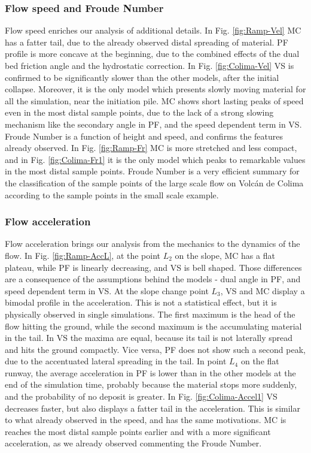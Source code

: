 \documentclass{article}
\begin{document}
\subsubsection{Flow speed and Froude Number}
Flow speed enriches our analysis of additional details. In Fig. \ref{fig:Ramp-Vel} MC has a fatter tail, due to the already observed distal spreading of material. PF profile is more concave at the beginning, due to the combined effects of the dual bed friction angle and the hydrostatic correction. In Fig. \ref{fig:Colima-Vel} VS is confirmed to be significantly slower than the other models, after the initial collapse. Moreover, it is the only model which presents slowly moving material for all the simulation, near the initiation pile. MC shows short lasting peaks of speed even in the most distal sample points, due to the lack of a strong slowing mechanism like the secondary angle in PF, and the speed dependent term in VS. Froude Number is a function of height and speed, and confirms the features already observed. In Fig. \ref{fig:Ramp-Fr} MC is more stretched and less compact, and in Fig. \ref{fig:Colima-Fr1} it is the only model which peaks to remarkable values in the most distal sample points. Froude Number is a very efficient summary for the classification of the sample points of the large scale flow on Volc\'{a}n de Colima according to the sample points in the small scale example.

\subsubsection{Flow acceleration}
Flow acceleration brings our analysis from the mechanics to the dynamics of the flow. In Fig. \ref{fig:Ramp-AccL}, at the point $L_2$ on the slope, MC has a flat plateau, while PF is linearly decreasing, and VS is bell shaped. Those differences are a consequence of the assumptions behind the models - dual angle in PF, and speed dependent term in VS. At the slope change point $L_3$, VS and MC display a bimodal profile in the acceleration. This is not a statistical effect, but it is physically observed in single simulations. The first maximum is the head of the flow hitting the ground, while the second maximum is the accumulating material in the tail. In VS the maxima are equal, because its tail is not laterally spread and hits the ground compactly. Vice versa, PF does not show such a second peak, due to the accentuated lateral spreading in the tail. In point $L_4$ on the flat runway, the average acceleration in PF is lower than in the other models at the end of the simulation time, probably because the material stops more suddenly, and the probability of no deposit is greater. In Fig. \ref{fig:Colima-Accel1} VS decreases faster, but also displays a fatter tail in the acceleration. This is similar to what already observed in the speed, and has the same motivations. MC is reaches the most distal sample points earlier and with a more significant acceleration, as we already observed commenting the Froude Number.
\end{document}
